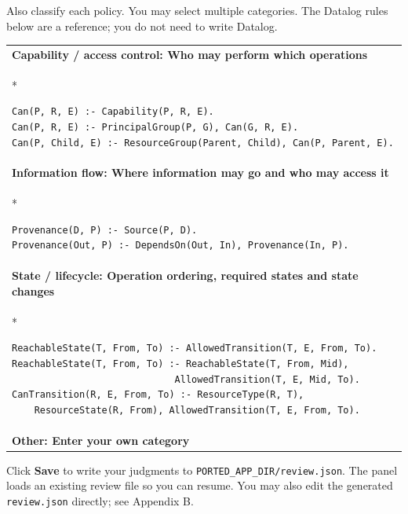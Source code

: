 \documentclass[10pt,a4paper]{article}
\begin{document}
\begin{minipage}{\linewidth}
Also classify each policy. You may select multiple categories. The Datalog
rules below are a reference; you do not need to write Datalog.
\par\smallskip

\begingroup
\setlength{\tabcolsep}{6pt}
\begin{tabular}{|p{\dimexpr\linewidth-2\tabcolsep-2\arrayrulewidth\relax}|}
\hline
\textbf{Capability / access control: Who may perform which operations} \\*
\rowcolor{policygray}
\begin{minipage}{\linewidth}
\begin{lstlisting}[xleftmargin=0pt,xrightmargin=0pt]
Can(P, R, E) :- Capability(P, R, E).
Can(P, R, E) :- PrincipalGroup(P, G), Can(G, R, E).
Can(P, Child, E) :- ResourceGroup(Parent, Child), Can(P, Parent, E).
\end{lstlisting}
\end{minipage} \\
\hline
\textbf{Information flow: Where information may go and who may access it} \\*
\rowcolor{policygray}
\begin{minipage}{\linewidth}
\begin{lstlisting}[xleftmargin=0pt,xrightmargin=0pt]
Provenance(D, P) :- Source(P, D).
Provenance(Out, P) :- DependsOn(Out, In), Provenance(In, P).
\end{lstlisting}
\end{minipage} \\
\hline
\textbf{State / lifecycle: Operation ordering, required states and state changes} \\*
\rowcolor{policygray}
\begin{minipage}{\linewidth}
\begin{lstlisting}[xleftmargin=0pt,xrightmargin=0pt]
ReachableState(T, From, To) :- AllowedTransition(T, E, From, To).
ReachableState(T, From, To) :- ReachableState(T, From, Mid),
                             AllowedTransition(T, E, Mid, To).
CanTransition(R, E, From, To) :- ResourceType(R, T),
    ResourceState(R, From), AllowedTransition(T, E, From, To).
\end{lstlisting}
\end{minipage} \\
\hline
\textbf{Other: Enter your own category} \\
\hline
\end{tabular}
\endgroup
\par\smallskip

Click \textbf{Save} to write your judgments to
\texttt{PORTED\_APP\_DIR/review.json}. The panel loads an existing review file so
you can resume. You may also edit the generated \texttt{review.json} directly;
see Appendix B.
\end{minipage}
\end{document}
